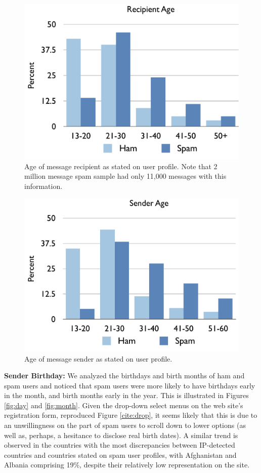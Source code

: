 \documentclass[preprint]{acm_proc_article-sp}
\begin{document}
\begin{figure}[h]
    \centering
    \includegraphics[width=\linewidth]{figures/recip-age.pdf}
    \caption{Age of message recipient as stated on user profile. Note that 2 million message spam sample 
        had only 11,000 messages with this information.}
    \label{fig:recipage}
\end{figure}

\begin{figure}[h]
    \centering
    \includegraphics[width=\linewidth]{figures/sender-age.pdf}
    \caption{Age of message sender as stated on user profile. }
    \label{fig:sendage}
\end{figure}

\textbf{Sender Birthday:} We analyzed the birthdays and birth months of ham and spam users and noticed that spam users 
were more likely to have birthdays early in the month, and birth months early in the year. This is illustrated in 
Figures \ref{fig:day} and \ref{fig:month}. Given the drop-down select menus on the web site's registration form, reproduced 
Figure \ref{cite:drop}, it seems likely that this is due to an unwillingness on the part of spam users to 
scroll down to lower options (as well as, perhaps, a hesitance to disclose real birth dates). A similar trend is 
observed in the countries with the most discrepancies between IP-detected countries and countries stated on spam 
user profiles, with Afghanistan and Albania comprising 19\%, despite their relatively low representation on the 
site. 
\end{document}
